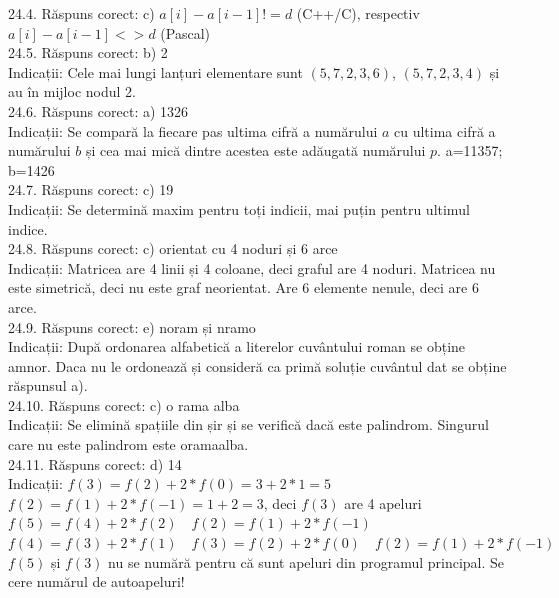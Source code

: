 24.4. Răspuns corect: c) $a[i]-a[i-1]!=d$ (C++/C), respectiv $a[i]-a[i-1]<>d$ (Pascal)\\

24.5. Răspuns corect: b) 2\\
Indicații: Cele mai lungi lanțuri elementare sunt $(5, 7, 2, 3, 6)$, $(5, 7, 2, 3, 4)$ și au în mijloc nodul 2.\\

24.6. Răspuns corect: a) 1326\\
Indicații: Se compară la fiecare pas ultima cifră a numărului $a$ cu ultima cifră a numărului $b$ și cea mai mică dintre acestea este adăugată numărului $p$. a=11357; b=1426\\

24.7. Răspuns corect: c) 19\\
Indicații: Se determină maxim pentru toți indicii, mai puțin pentru ultimul indice.\\

24.8. Răspuns corect: c) orientat cu 4 noduri și 6 arce\\
Indicații: Matricea are 4 linii și 4 coloane, deci graful are 4 noduri. Matricea nu este simetrică, deci nu este graf neorientat. Are 6 elemente nenule, deci are 6 arce.\\

24.9. Răspuns corect: e) noram și nramo\\
Indicații: După ordonarea alfabetică a literelor cuvântului roman se obține amnor. Daca nu le ordonează și consideră ca primă soluție cuvântul dat se obține răspunsul a).\\

24.10. Răspuns corect: c) o rama alba\\
Indicații: Se elimină spațiile din șir și se verifică dacă este palindrom. Singurul care nu este palindrom este oramaalba.\\

24.11. Răspuns corect: d) 14\\
Indicații: $f(3)=f(2)+2 * f(0)=3+2 * 1=5$\\ $f(2)=f(1)+2 * f(-1)=1+2=3$, deci $f(3)$ are 4 apeluri\\ $f(5)=f(4)+2 * f(2) \quad f(2)=f(1)+2 * f(-1)$\\ $f(4)=f(3)+2 * f(1) \quad f(3)=f(2)+2 * f(0) \quad f(2)=f(1)+2 * f(-1)$\\ $f(5)$ și $f(3)$ nu se numără pentru că sunt apeluri din programul principal. Se cere numărul de autoapeluri!\\

